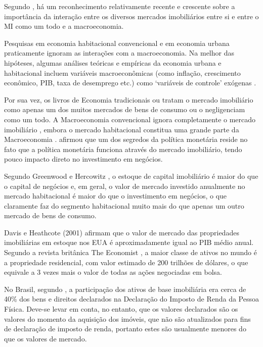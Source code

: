 \documentclass[
	12pt,				%
	oneside,			%
	a4paper,			%
	chapter=TITLE,		%
	section=TITLE,		%
	english,			%
	brazil				%
	]{abntex2}
\begin{document}
Segundo \textcite{LEUNG}, há um reconhecimento relativamente recente e crescente
sobre a importância da interação entre os diversos mercados imobiliários entre
si e entre o \gls{MI} como um todo e a macroeconomia.

Pesquisas em economia habitacional convencional e em economia urbana
praticamente ignoram as interações com a macroeconomia. Na melhor das hipóteses,
algumas análises teóricas e empíricas da economia urbana e habitacional incluem
variáveis macroeconômicas (como inflação, crescimento econômico, PIB, taxa de
desemprego etc.) como `variáveis de controle' exógenas \autocite[3]{LEUNG}.

Por sua vez, os livros de Economia tradicionais ou tratam o mercado imobiliário
como apenas um dos muitos mercados de bens de consumo ou o negligenciam como um
todo. A Macroeconomia convencional ignora completamente o mercado imobiliário
\autocite[3]{LEUNG}, embora o mercado habitacional constitua uma grande parte da
Macroeconomia \autocite[5]{LEUNG}. \textcite{krugman} afirmou que um dos segredos da
política monetária reside no fato que a política monetária funciona através do
mercado imobiliário, tendo pouco impacto direto no investimento em negócios.

Segundo Greenwood e Hercowitz \autocite[\emph{apud}][5]{LEUNG}, o estoque de capital
imobiliário é maior do que o capital de negócios e, em geral, o valor de mercado
investido anualmente no mercado habitacional é maior do que o investimento em
negócios, o que claramente faz do segmento habitacional muito mais do que apenas
um outro mercado de bens de consumo.

Davis e Heathcote (2001) \autocite[\emph{apud}][6]{LEUNG} afirmam que o valor de mercado das
propriedades imobiliárias em estoque nos EUA é aproximadamente igual ao PIB
médio anual. Segundo a revista britânica The Economist \autocite{economist}, a maior
classe de ativos no mundo é a propriedade residencial, com valor estimado de 200
trilhões de dólares, o que equivale a 3 vezes mais o valor de todas as ações
negociadas em bolsa.

No Brasil, segundo \textcites{fnogueira}[155]{fnogueira}, a participação dos ativos de
base imobiliária era cerca de 40\% dos bens e direitos declarados na Declaração
do Imposto de Renda da Pessoa Física. Deve-se levar em conta, no entanto, que
os valores declarados são os valores do momento da aquisição dos imóveis, que
não são atualizados para fins de declaração de imposto de renda, portanto estes
são usualmente menores do que os valores de mercado.
\end{document}
